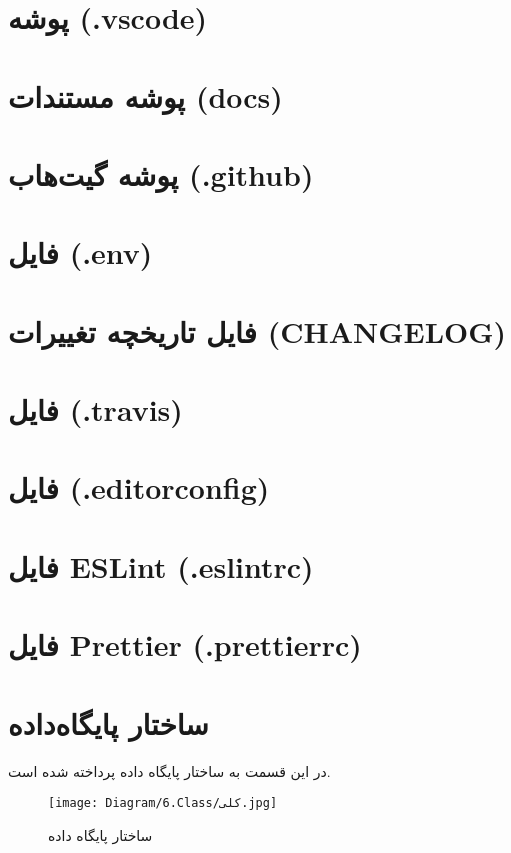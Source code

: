 \section{پوشه  (.vscode)}


\section{پوشه مستندات (docs)}


\section{پوشه گیت‌هاب (.github)}


\section{فایل  (.env)}


\section{فایل تاریخچه تغییرات (CHANGELOG)}


\section{فایل  (.travis)}


\section{فایل  (.editorconfig)}


\section{فایل ESLint (.eslintrc)}


\section{فایل Prettier (.prettierrc)}





\section{ساختار پایگاه‌داده}
در این قسمت به ساختار پایگاه داده پرداخته شده است.
\begin{figure}[H]
	\texttt{[image: Diagram/6.Class/کلی.jpg]}
	\centering
	\caption{ساختار پایگاه داده}
	\label{fig:db:پایگاه}
\end{figure}

